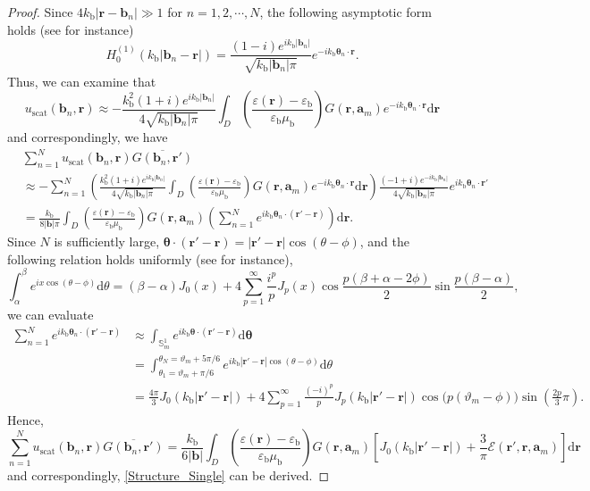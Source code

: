 \documentclass[3p,10pt]{elsarticle}
\newcommand{\eps}{\varepsilon}
\newcommand{\kb}{k_{\mathrm{b}}}
\newcommand{\epsb}{\varepsilon_{\mathrm{b}}}
\newcommand{\mub}{\mu_{\mathrm{b}}}
\newcommand{\rd}{\mathrm{d}}
\newcommand{\ma}{\mathbf{a}}
\newcommand{\mb}{\mathbf{b}}
\newcommand{\mr}{\mathbf{r}}
\newcommand{\vt}{\boldsymbol{\theta}}
\DeclareMathOperator*{\scat}{scat}
\theoremstyle{plain}
\theoremstyle{remark}
\begin{document}
\begin{proof}
Since $4\kb|\mr-\mb_n|\gg1$ for $n=1,2,\cdots,N$, the following asymptotic form holds (see \cite{CK} for instance)
\begin{equation}\label{Asymptotic_Hankel}
H_0^{(1)}(\kb|\mb_n-\mr|)=\frac{(1-i)e^{i\kb|\mb_n|}}{\sqrt{\kb|\mb_n|\pi}}e^{-i\kb\vt_n\cdot\mr}.
\end{equation}
Thus, we can examine that
\[u_{\scat}(\mb_n,\mr)\approx-\frac{\kb^2(1+i)e^{i\kb|\mb_n|}}{4\sqrt{\kb|\mb_n|\pi}}\int_D\left(\frac{\eps(\mr)-\epsb}{\epsb\mub}\right)G(\mr,\ma_m)e^{-i\kb\vt_n\cdot\mr}\rd\mr\]
and correspondingly, we have
\begin{align*}
&\sum_{n=1}^{N}u_{\scat}(\mb_n,\mr)\overline{G(\mb_n,\mr')}\\
&\approx-\sum_{n=1}^{N}\left(\frac{\kb^2(1+i)e^{i\kb|\mb_n|}}{4\sqrt{\kb|\mb_n|\pi}}\int_D\left(\frac{\eps(\mr)-\epsb}{\epsb\mub}\right)G(\mr,\ma_m)e^{-i\kb\vt_n\cdot\mr}\rd\mr\right)\frac{(-1+i)e^{-i\kb|\mb_n|}}{4\sqrt{\kb|\mb_n|\pi}}e^{i\kb\vt_n\cdot\mr'}\\
&=\frac{\kb}{8|\mb|\pi}\int_D\left(\frac{\eps(\mr)-\epsb}{\epsb\mub}\right)G(\mr,\ma_m)\left(\sum_{n=1}^{N}e^{i\kb\vt_n\cdot(\mr'-\mr)}\right)\rd\mr.
\end{align*}
Since $N$ is sufficiently large, $\vt\cdot(\mr'-\mr)=|\mr'-\mr|\cos(\theta-\phi)$, and the following relation holds uniformly (see \cite{P-SUB3} for instance),
\begin{equation}\label{Jacobi-Anger}
\int_{\alpha}^{\beta}e^{ix\cos(\theta-\phi)}\rd\theta=(\beta-\alpha)J_0(x)+4\sum_{p=1}^{\infty}\frac{i^p}{p}J_p(x)\cos\frac{p(\beta+\alpha-2\phi)}{2}\sin\frac{p(\beta-\alpha)}{2},
\end{equation}
we can evaluate
\begin{align*}
\sum_{n=1}^{N}e^{i\kb\vt_n\cdot(\mr'-\mr)}&\approx\int_{\mathbb{S}_m^1}e^{i\kb\vt\cdot(\mr'-\mr)}\rd\vt\\
&=\int_{\theta_1=\vartheta_m+\pi/6}^{\theta_N=\vartheta_m+5\pi/6}e^{i\kb|\mr'-\mr|\cos(\theta-\phi)}\rd\theta\\%
&=\frac{4\pi}{3}J_0(\kb|\mr'-\mr|)+4\sum_{p=1}^{\infty}\frac{(-i)^p}{p}J_p(\kb|\mr'-\mr|)\cos\big(p(\vartheta_m-\phi)\big)\sin\left(\frac{2p}{3}\pi\right).
\end{align*}
Hence,
\[\sum_{n=1}^{N}u_{\scat}(\mb_n,\mr)\overline{G(\mb_n,\mr')}=\frac{\kb}{6|\mb|}\int_D\left(\frac{\eps(\mr)-\epsb}{\epsb\mub}\right)G(\mr,\ma_m)\left[J_0(\kb|\mr'-\mr|)+\frac{3}{\pi}\mathcal{E}(\mr',\mr,\ma_m)\right]\rd\mr\]
and correspondingly, \eqref{Structure_Single} can be derived.
\end{proof}
\end{document}
